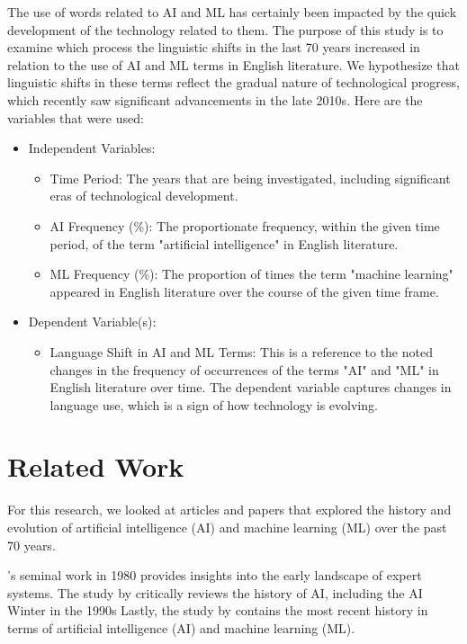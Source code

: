 \documentclass[11pt]{article}
\begin{document}
{The use of words related to AI and ML has certainly been impacted by the quick development of the technology related to them. The purpose of this study is to examine which process the linguistic shifts in the last 70 years increased in relation to the use of AI and ML terms in English literature. We hypothesize that linguistic shifts in these terms reflect the gradual nature of technological progress, which recently saw significant advancements in the late 2010s. Here are the variables that were used:
}
{


\begin{itemize}
    \item[\textbullet] Independent Variables:
    \begin{itemize}
        \item Time Period: The years that are being investigated, including significant eras of technological development.
        \item AI Frequency (\%): The proportionate frequency, within the given time period, of the term "artificial intelligence" in English literature.
        \item ML Frequency (\%): The proportion of times the term "machine learning" appeared in English literature over the course of the given time frame.
    \end{itemize}
    \item[\textbullet] Dependent Variable(s):
    \begin{itemize}
        \item Language Shift in AI and ML Terms: This is a reference to the noted changes in the frequency of occurrences of the terms "AI" and "ML" in English literature over time. The dependent variable captures changes in language use, which is a sign of how technology is evolving.
    \end{itemize}
\end{itemize}



\section{Related Work}



For this research, we looked at articles and papers that explored the history and evolution of  artificial intelligence (AI) and machine learning (ML) over the past 70 years.

\citep{Feigenbaum:ea:1980}'s seminal work in 1980 provides insights into the early landscape of expert systems.
The study by \citep{Washington:2006} critically reviews the history of AI, including the AI Winter in the 1990s
Lastly, the study by \cite{PET:2021} contains the most recent history in terms of artificial intelligence (AI) and machine learning (ML).

}
\end{document}
